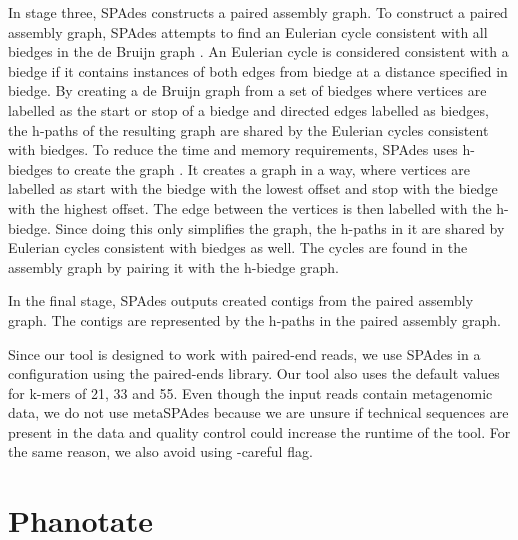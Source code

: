 In stage three, SPAdes constructs a paired assembly graph. To construct a paired assembly graph, SPAdes attempts to find an Eulerian cycle consistent with all biedges in the de Bruijn graph \cite{bankevich2012spades}. An Eulerian cycle is considered consistent with a biedge if it contains instances of both edges from biedge at a distance specified in biedge. By creating a de Bruijn graph from a set of biedges where vertices are labelled as the start or stop of a biedge and directed edges labelled as biedges, the h-paths of the resulting graph are shared by the Eulerian cycles consistent with biedges. To reduce the time and memory requirements, SPAdes uses h-biedges to create the graph \cite{bankevich2012spades}. It creates a graph in a way, where vertices are labelled as start with the biedge with the lowest offset and stop with the biedge with the highest offset. The edge between the vertices is then labelled with the h-biedge. Since doing this only simplifies the graph, the h-paths in it are shared by Eulerian cycles consistent with biedges as well. The cycles are found in the assembly graph by pairing it with the h-biedge graph.

In the final stage, SPAdes outputs created contigs from the paired assembly graph. The contigs are represented by the h-paths in the paired assembly graph.

Since our tool is designed to work with paired-end reads, we use SPAdes in a configuration using the paired-ends library. Our tool also uses the default values for k-mers of 21, 33 and 55. Even though the input reads contain metagenomic data, we do not use metaSPAdes because we are unsure if technical sequences are present in the data and quality control could increase the runtime of the tool. For the same reason, we also avoid using -careful flag.

\section{Phanotate}
